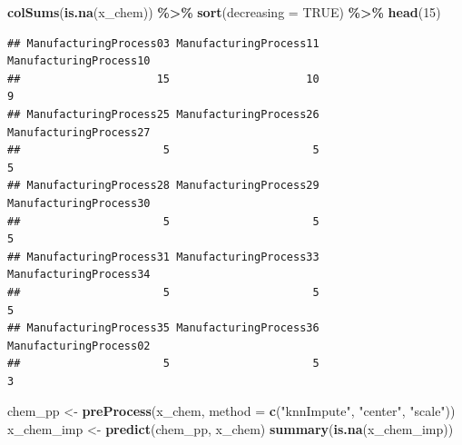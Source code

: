 \documentclass[
  11pt,
]{article}
\newenvironment{Shaded}{\begin{snugshade}}{\end{snugshade}}
\newcommand{\AttributeTok}[1]{\textcolor[rgb]{0.13,0.29,0.53}{#1}}
\newcommand{\ConstantTok}[1]{\textcolor[rgb]{0.56,0.35,0.01}{#1}}
\newcommand{\DecValTok}[1]{\textcolor[rgb]{0.00,0.00,0.81}{#1}}
\newcommand{\FunctionTok}[1]{\textcolor[rgb]{0.13,0.29,0.53}{\textbf{#1}}}
\newcommand{\NormalTok}[1]{#1}
\newcommand{\OtherTok}[1]{\textcolor[rgb]{0.56,0.35,0.01}{#1}}
\newcommand{\SpecialCharTok}[1]{\textcolor[rgb]{0.81,0.36,0.00}{\textbf{#1}}}
\newcommand{\StringTok}[1]{\textcolor[rgb]{0.31,0.60,0.02}{#1}}
\begin{document}
\begin{Shaded}
\begin{Highlighting}[]
\FunctionTok{colSums}\NormalTok{(}\FunctionTok{is.na}\NormalTok{(x\_chem)) }\SpecialCharTok{\%\textgreater{}\%} \FunctionTok{sort}\NormalTok{(}\AttributeTok{decreasing =} \ConstantTok{TRUE}\NormalTok{) }\SpecialCharTok{\%\textgreater{}\%} \FunctionTok{head}\NormalTok{(}\DecValTok{15}\NormalTok{)}
\end{Highlighting}
\end{Shaded}

\begin{verbatim}
## ManufacturingProcess03 ManufacturingProcess11 ManufacturingProcess10 
##                     15                     10                      9 
## ManufacturingProcess25 ManufacturingProcess26 ManufacturingProcess27 
##                      5                      5                      5 
## ManufacturingProcess28 ManufacturingProcess29 ManufacturingProcess30 
##                      5                      5                      5 
## ManufacturingProcess31 ManufacturingProcess33 ManufacturingProcess34 
##                      5                      5                      5 
## ManufacturingProcess35 ManufacturingProcess36 ManufacturingProcess02 
##                      5                      5                      3
\end{verbatim}

\begin{Shaded}
\begin{Highlighting}[]
\NormalTok{chem\_pp }\OtherTok{\textless{}{-}} \FunctionTok{preProcess}\NormalTok{(x\_chem, }\AttributeTok{method =} \FunctionTok{c}\NormalTok{(}\StringTok{"knnImpute"}\NormalTok{, }\StringTok{"center"}\NormalTok{, }\StringTok{"scale"}\NormalTok{))}
\NormalTok{x\_chem\_imp }\OtherTok{\textless{}{-}} \FunctionTok{predict}\NormalTok{(chem\_pp, x\_chem)}
\FunctionTok{summary}\NormalTok{(}\FunctionTok{is.na}\NormalTok{(x\_chem\_imp))}
\end{Highlighting}
\end{Shaded}
\end{document}
